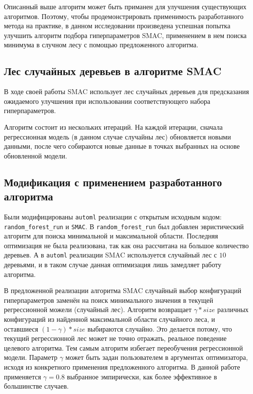 Описанный выше алгоритм может быть приманен для улучшения существующих
алгоритмов. Поэтому, чтобы продемонстрировать применимость разработанного метода
на практике, в данном исследовании произведена успешная попытка улучшить
алгоритм подбора гиперпараметров SMAC, применением в нем поиска минимума
в случном лесу с помощью предложенного алгоритма.

\subsection{Лес случайных деревьев в алгоритме SMAC}

В ходе своей работы SMAC использует лес случайных деревьев для предсказания
ожидаемого улучшения при использовании соответствующего набора гиперпараметров.

Алгоритм состоит из нескольких итераций. На каждой итерации, сначала
регрессионная модель (в данном случае случайны лес) обновляется новыми данными,
после чего собираются новые данные в точках выбранных на основе обновленной
модели.

\subsection{Модификация с применением разработанного алгоритма}

Были модифицированы \texttt{automl} реализации с открытым исходным кодом:
\texttt{random\_forest\_run} и \texttt{SMAC}. В \texttt{random\_forest\_run} был
добавлен эвристический алгоритм для поиска минимальной и максимальной области.
Последняя оптимизация не была реализована, так как она рассчитана на большое
количество деревьев. А в \texttt{automl} реализации SMAC используется случайный
лес с $10$ деревьями, и в таком случае данная оптимизация лишь замедляет работу
алгоритма.

В предложенной реализации алгоритма SMAC случайный выбор конфигураций
гиперпараметров заменён на поиск минимального значения в текущей регрессионной
можели (случайный лес). Алгоритм возвращает $\gamma * size$ различных
конфигураций из найденной максимальной области случайного леса, и оставшиеся $(1
- \gamma) * size$ выбираются случайно. Это делается потому, что текущий
регрессионной лес может не точно отражать, реальное поведение целевого
алгоритма. Тем самым алгоритм избегает переобучения регрессионной модели.
Параметр $\gamma$ может быть задан пользователем в аргументах оптимизатора,
исходя из конкретного применения предложенного алгоритма. В данной работе
применяется $\gamma=0.8$ выбранное эмпирически, как более эффективное
в большинстве случаев.

